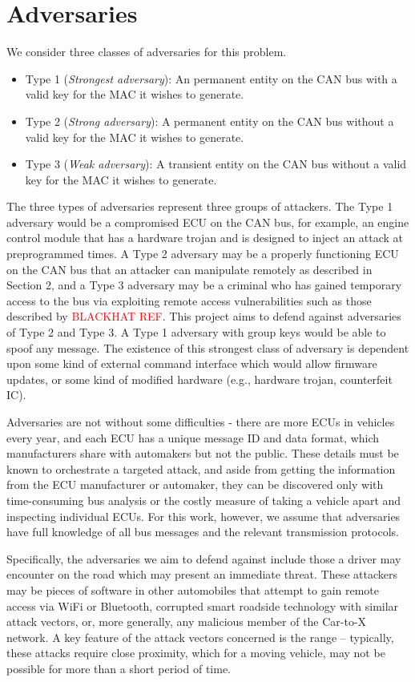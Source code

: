 \section{Adversaries}
We consider three classes of adversaries for this problem.

\begin{itemize}
	\item Type 1 (\textit{Strongest adversary}): An permanent entity on the CAN bus with a valid key for the MAC it wishes to generate.
	\item Type 2 (\textit{Strong adversary}): A permanent entity on the CAN bus without a valid key for the MAC it wishes to generate.
	\item Type 3 (\textit{Weak adversary}): A transient entity on the CAN bus without a valid key for the MAC it wishes to generate.
\end{itemize}

The three types of adversaries represent three groups of attackers. The Type 1 adversary would be a compromised ECU on the CAN bus, for example, an engine control module that has a hardware trojan and is designed to inject an attack at preprogrammed times. A Type 2 adversary may be a properly functioning ECU on the CAN bus that an attacker can manipulate remotely as described in Section 2, and a Type 3 adversary may be a criminal who has gained temporary access to the bus via exploiting remote access vulnerabilities such as those described by \textcolor{red}{BLACKHAT REF}. This project aims to defend against adversaries of Type 2 and Type 3. A Type 1 adversary with group keys would be able to spoof any message. The existence of this strongest class of adversary is dependent upon some kind of external command interface which would allow firmware updates, or some kind of modified hardware (e.g., hardware trojan, counterfeit IC).

Adversaries are not without some difficulties - there are more ECUs in vehicles every year, and each ECU has a unique message ID and data format, which manufacturers share with automakers but not the public. These details must be known to orchestrate a targeted attack, and aside from getting the information from the ECU manufacturer or automaker, they can be discovered only with time-consuming bus analysis or the costly measure of taking a vehicle apart and inspecting individual ECUs. For this work, however, we assume that adversaries have full knowledge of all bus messages and the relevant transmission protocols.

Specifically, the adversaries we aim to defend against include those a driver may encounter on the road which may present an immediate threat. These attackers may be pieces of software in other automobiles that attempt to gain remote access via WiFi or Bluetooth, corrupted smart roadside technology with similar attack vectors, or, more generally, any malicious member of the Car-to-X network. A key feature of the attack vectors concerned is the range -- typically, these attacks require close proximity, which for a moving vehicle, may not be possible for more than a short period of time. 

